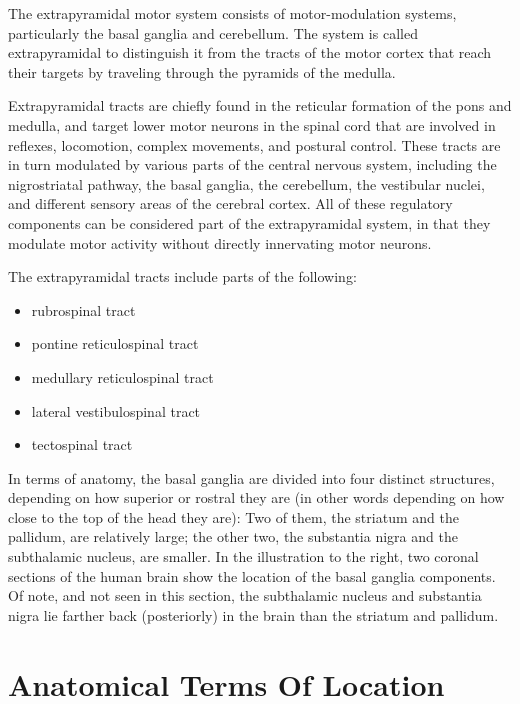 The extrapyramidal motor system consists of motor-modulation systems, particularly the basal ganglia and cerebellum. The system is called extrapyramidal to distinguish it from the tracts of the motor cortex that reach their targets by traveling through the pyramids of the medulla.

Extrapyramidal tracts are chiefly found in the reticular formation of the pons and medulla, and target lower motor neurons in the spinal cord that are involved in reflexes, locomotion, complex movements, and postural control. These tracts are in turn modulated by various parts of the central nervous system, including the nigrostriatal pathway, the basal ganglia, the cerebellum, the vestibular nuclei, and different sensory areas of the cerebral cortex. All of these regulatory components can be considered part of the extrapyramidal system, in that they modulate motor activity without directly innervating motor neurons.

The extrapyramidal tracts include parts of the following:

\begin{itemize}
\tightlist
\item
  rubrospinal tract
\item
  pontine reticulospinal tract
\item
  medullary reticulospinal tract
\item
  lateral vestibulospinal tract
\item
  tectospinal tract
\end{itemize}

In terms of anatomy, the basal ganglia are divided into four distinct structures, depending on how superior or rostral they are (in other words depending on how close to the top of the head they are): Two of them, the striatum and the pallidum, are relatively large; the other two, the substantia nigra and the subthalamic nucleus, are smaller. In the illustration to the right, two coronal sections of the human brain show the location of the basal ganglia components. Of note, and not seen in this section, the subthalamic nucleus and substantia nigra lie farther back (posteriorly) in the brain than the striatum and pallidum.

\hypertarget{appendix-appendix}{%
\appendix}


\hypertarget{anatomical-terms-of-location}{%
\chapter{Anatomical Terms Of Location}\label{anatomical-terms-of-location}}

